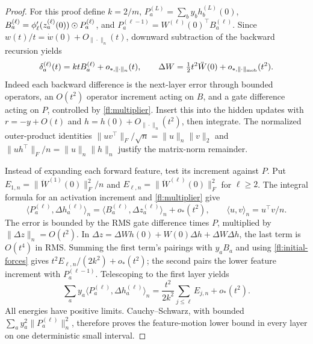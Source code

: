 \begin{proof}
For this proof define $k=2/m$, $P_a^{(L)}=\sum_b y_bh_b^{(L)}(0)$,
$B_a^{(\ell)}=\phi_\ell'(z_a^{(\ell)}(0))\mathbin{\odot} P_a^{(\ell)}$, and
$P_a^{(\ell-1)}=W^{(\ell)}(0)^\top B_a^{(\ell)}$.
Since $w(t)/t=\dot w(0)+O_{\|\cdot\|_n}(t)$, downward subtraction of
the backward recursion yields
\begin{equation}
 \delta_a^{(\ell)}(t)=ktB_a^{(\ell)}+o_{*,\|\cdot\|_n}(t),\qquad
 \Delta W=\tfrac12t^2\ddot W(0)+o_{*,\|\cdot\|_{\rm mob}}(t^2).
 \label{fl:weight-expansion}
\end{equation}
Indeed each backward difference is the next-layer error through bounded
operators, an $O(t^2)$ operator increment acting on $B$, and a gate
difference acting on $P$, controlled by \eqref{fl:multiplier}.
Insert this into the hidden updates with $r=-y+O(t)$ and
$h=h(0)+O_{\|\cdot\|_n}(t^2)$, then integrate. The normalized outer-product
identities $\|uv^\top\|_F/\sqrt n=\|u\|_n\|v\|_2$ and
$\|uh^\top\|_F/n=\|u\|_n\|h\|_n$ justify the matrix-norm remainder.

Instead of expanding each forward feature, test its increment against $P$.
Put $E_{1,n}=\|\ddot W^{(1)}(0)\|_F^2/n$ and
$E_{\ell,n}=\|\ddot W^{(\ell)}(0)\|_F^2$ for $\ell\ge2$.
The integral formula for an activation increment and \eqref{fl:multiplier}
give
\[
 \langle P_a^{(\ell)},\Delta h_a^{(\ell)}\rangle_n
  =\langle B_a^{(\ell)},\Delta z_a^{(\ell)}\rangle_n+o_*(t^2),
 \qquad \langle u,v\rangle_n=u^\top v/n.
\]
The error is bounded by the RMS gate difference times $P$, multiplied by
$\|\Delta z\|_n=O(t^2)$. In
$\Delta z=\Delta W h(0)+W(0)\Delta h+\Delta W\Delta h$,
the last term is $O(t^4)$ in RMS. Summing the first term's pairings with
$y_aB_a$ and using \eqref{fl:initial-forces} gives
$t^2E_{\ell,n}/(2k^2)+o_*(t^2)$; the second pairs the lower feature
increment with $P_a^{(\ell-1)}$. Telescoping to the first layer yields
\begin{equation}
 \sum_a y_a\langle P_a^{(\ell)},\Delta h_a^{(\ell)}\rangle_n
   =\frac{t^2}{2k^2}\sum_{j\le\ell}E_{j,n}+o_*(t^2).
 \label{fl:adjoint-increment}
\end{equation}
All energies have positive limits. Cauchy--Schwarz, with bounded
$\sum_a y_a^2\|P_a^{(\ell)}\|_n^2$, therefore proves the feature-motion
lower bound in every layer on one deterministic small interval.


\end{proof}
